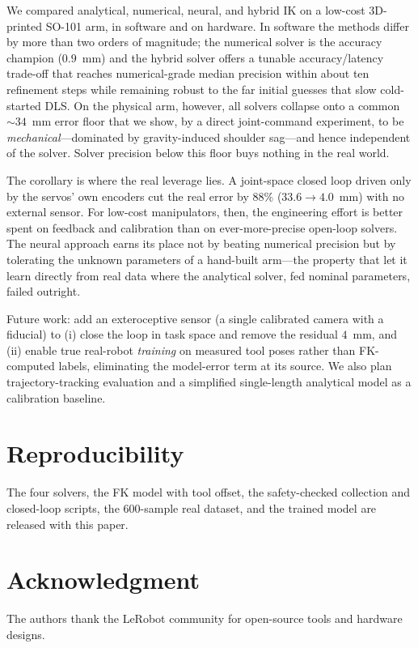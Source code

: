 \documentclass[conference]{IEEEtran}
\begin{document}
We compared analytical, numerical, neural, and hybrid IK on a low-cost 3D-printed SO-101 arm, in software and on hardware. In software the methods differ by more than two orders of magnitude; the numerical solver is the accuracy champion ($0.9$~mm) and the hybrid solver offers a tunable accuracy/latency trade-off that reaches numerical-grade median precision within about ten refinement steps while remaining robust to the far initial guesses that slow cold-started DLS. On the physical arm, however, all solvers collapse onto a common $\sim\!34$~mm error floor that we show, by a direct joint-command experiment, to be \emph{mechanical}---dominated by gravity-induced shoulder sag---and hence independent of the solver. Solver precision below this floor buys nothing in the real world.

The corollary is where the real leverage lies. A joint-space closed loop driven only by the servos' own encoders cut the real error by $88\%$ ($33.6\!\to\!4.0$~mm) with no external sensor. For low-cost manipulators, then, the engineering effort is better spent on feedback and calibration than on ever-more-precise open-loop solvers. The neural approach earns its place not by beating numerical precision but by tolerating the unknown parameters of a hand-built arm---the property that let it learn directly from real data where the analytical solver, fed nominal parameters, failed outright.

Future work: add an exteroceptive sensor (a single calibrated camera with a fiducial) to (i) close the loop in task space and remove the residual $4$~mm, and (ii) enable true real-robot \emph{training} on measured tool poses rather than FK-computed labels, eliminating the model-error term at its source. We also plan trajectory-tracking evaluation and a simplified single-length analytical model as a calibration baseline.

\section*{Reproducibility}
The four solvers, the FK model with tool offset, the safety-checked collection and closed-loop scripts, the $600$-sample real dataset, and the trained model are released with this paper.

\section*{Acknowledgment}
The authors thank the LeRobot community for open-source tools and hardware designs.
\end{document}
